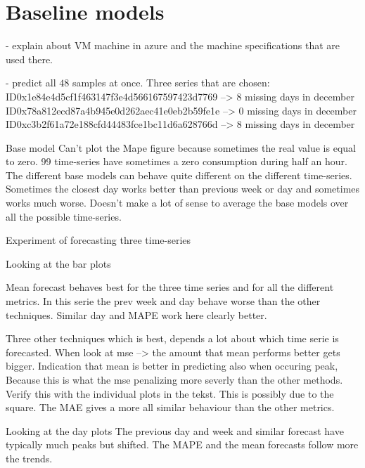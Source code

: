 \section{Baseline models}\label{s:Baseline models}
- explain about VM machine in azure and the machine specifications that are used there.

- predict all $ 48 $ samples at once.
		Three series that are chosen:
ID0x1e84e4d5cf1f463147f3e4d566167597423d7769 
--> 8 missing days in december
ID0x78a812ecd87a4b945e0d262aec41e0eb2b59fe1e
--> 0 missing days in december
ID0xc3b2f61a72e188cfd44483fce1bc11d6a628766d
--> 8 missing days in december

Base model
Can't plot the Mape figure because sometimes the real value is equal to zero. 99 time-series have sometimes a zero consumption during half an hour.
The different base models can behave quite different on the different time-series. Sometimes the closest day works better than previous week or day and sometimes works much worse. Doesn't make a lot of sense to average the base models over all the possible time-series. 

Experiment of forecasting three time-series

Looking at the bar plots

Mean forecast behaves best  for the three time series and for all the different metrics.
%
In this serie the prev week and day behave worse than the other techniques. Similar day and MAPE work here clearly better.

Three other techniques which is best, depends a lot about which time serie is forecasted. 
When look at mse --> the amount that mean performs better gets bigger. Indication that mean is better in predicting also when occuring peak,
Because this is what the mse penalizing more severly than the other methods. Verify this with the individual plots in the tekst.
This is possibly due to the square. The MAE gives a more all similar behaviour than the other metrics.

Looking at the day plots
The previous day and week and similar forecast have typically much peaks but shifted.
The MAPE and the mean forecasts follow more the trends.

